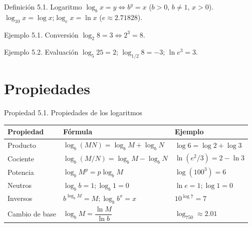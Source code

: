 \documentclass[12pt,letterpaper]{book}
\begin{document}
\begin{defbox}{Definición 5.1. Logaritmo}
$\log_b x=y\Leftrightarrow b^y=x$ ($b>0$, $b\neq1$, $x>0$).\\
$\log_{10}x=\log x$;\quad $\log_e x=\ln x$ ($e\approx2.71828$).
\end{defbox}

\begin{ejbox}{Ejemplo 5.1. Conversión}
$\log_2 8=3\Leftrightarrow2^3=8$.
\end{ejbox}

\begin{ejbox}{Ejemplo 5.2. Evaluación}
$\log_5 25=2$; $\log_{1/2}8=-3$; $\ln e^3=3$.
\end{ejbox}

\section{Propiedades}

\begin{propbox}{Propiedad 5.1. Propiedades de los logaritmos}
\begin{center}
\begin{tabular}{lll}
\textbf{Propiedad} & \textbf{Fórmula} & \textbf{Ejemplo}\\\hline
Producto & $\log_b(MN)=\log_bM+\log_bN$ & $\log6=\log2+\log3$\\
Cociente & $\log_b(M/N)=\log_bM-\log_bN$ & $\ln(e^2/3)=2-\ln3$\\
Potencia & $\log_bM^p=p\log_bM$ & $\log(100^3)=6$\\
Neutros & $\log_bb=1;\log_b1=0$ & $\ln e=1;\log1=0$\\
Inversos & $b^{\log_bM}=M;\log_bb^x=x$ & $10^{\log7}=7$\\
Cambio de base & $\log_bM=\dfrac{\ln M}{\ln b}$ & $\log_750\approx2.01$
\end{tabular}
\end{center}
\end{propbox}

\begin{center}
\end{center}
\end{document}

